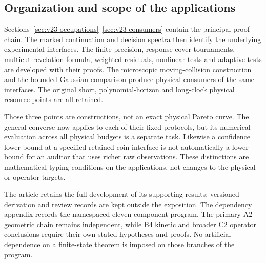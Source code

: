 \subsection{Organization and scope of the applications}
Sections~\ref{sec:v23-occupations}--\ref{sec:v23-consumers} contain the
principal proof chain. The marked continuation and decision spectra
then identify the underlying experimental interfaces. The finite
precision, response-cover tournaments, multicut revelation formula,
weighted residuals, nonlinear tests and adaptive tests are developed
with their proofs. The microscopic moving-collision construction and
the bounded Gaussian comparison produce physical consumers of the
same interfaces. The original short, polynomial-horizon and long-clock
physical resource points are all retained.

Those three points are constructions, not an exact physical Pareto
curve. The general converse now applies to each of their fixed
protocols, but its numerical evaluation across all physical budgets
is a separate task. Likewise a confidence lower bound at a specified
retained-coin interface is not automatically a lower bound for an
auditor that uses richer raw observations. These distinctions are
mathematical typing conditions on the applications, not changes to
the physical or operator targets.

The article retains the full development of its supporting results;
versioned derivation and review records are kept outside the exposition.
The dependency appendix records the namespaced eleven-component
program. The primary A2 geometric chain remains independent, while
B4 kinetic and broader C2 operator conclusions require their own stated
hypotheses and proofs. No artificial dependence on a finite-state
theorem is imposed on those branches of the program.
